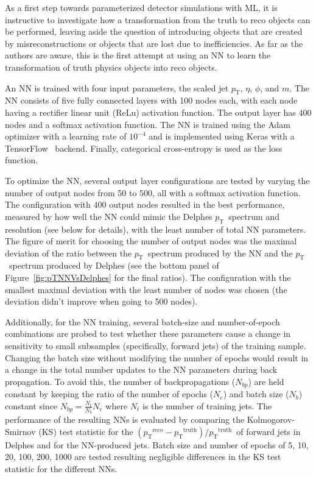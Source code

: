 \documentclass[showpacs,showkeys,preprint,prd,nofootinbib,linenumbers,12pt,superscriptaddress]{revtex4-1}
\def\pt{\ensuremath{p_{\mathrm{T}}}}
\def\ptRes{\ensuremath{(\pt^{\mathrm{reco}}-\pt^{\mathrm{truth}})/\pt^{\mathrm{truth}}}}
\begin{document}
As a first step towards parameterized detector simulations with ML, it is instructive to investigate how a transformation from the truth to reco objects can be performed, leaving aside the question of introducing objects that are created by misreconstructions or objects that are lost due to inefficiencies. As far as the authors are aware, this is the first attempt at using an NN to learn the transformation of truth physics objects into reco objects.

An NN is trained with four input parameters, the scaled jet \pt, $\eta$, $\phi$, and $m$. The NN consists of five fully connected layers with 100 nodes each, with each node having a rectifier linear unit (ReLu) activation function. The output layer has 400 nodes and a softmax activation function. The NN is trained using the Adam~\cite{adam} optimizer with a learning rate of $10^{-4}$ and is implemented using Keras with a TensorFlow~\cite{tensorflow2015-whitepaper} backend. Finally, categorical cross-entropy is used as the loss function.

To optimize the NN, several output layer configurations are tested by varying the number of output nodes from 50 to 500, all with a softmax activation function. The configuration with 400 output nodes resulted in the best performance, measured by how well the NN could mimic the Delphes \pt\ spectrum and resolution (see below for details), with the least number of total NN parameters. The figure of merit for choosing the number of output nodes was the maximal deviation of the ratio between the \pt\ spectrum produced by the NN and the \pt\ spectrum produced by Delphes (see the bottom panel of Figure~\ref{fig:pTNNVsDelphes} for the final ratios). The configuration with the smallest maximal deviation with the least number of nodes was chosen (the deviation didn't improve when going to 500 nodes).

Additionally, for the NN training, several batch-size and number-of-epoch combinations are probed to test whether these parameters cause a change in sensitivity to small subsamples (specifically, forward jets) of the training sample. Changing the batch size without modifying the number of epochs would result in a change in the total number updates to the NN parameters during back propagation. To avoid this, the number of backpropagations ($N_{bp}$) are held constant by keeping the ratio of the number of epochs ($N_e$) and batch size ($N_b$) constant since $N_{bp}=\frac{N_t}{N_b}N_e$ where $N_t$ is the number of training jets. The performance of the resulting NNs is evaluated by comparing the Kolmogorov-Smirnov (KS) test statistic for the \ptRes\ of forward jets in Delphes and for the NN-produced jets. Batch size and number of epochs of 5, 10, 20, 100, 200, 1000 are tested resulting negligible differences in the KS test statistic for the different NNs.
\end{document}
